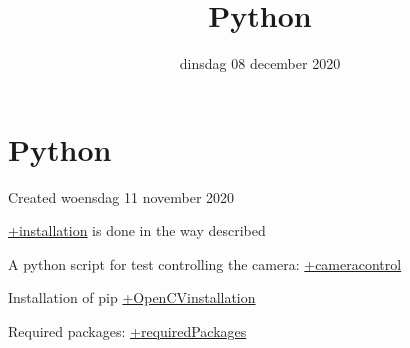 \documentclass{scrartcl}
\title{Python}
\date{dinsdag 08 december 2020}
\author{}
\begin{document}
\maketitle

		\section{Python}

Created woensdag 11 november 2020



\href{./Python/installation.tex}{+installation} is done in the way described



A python script for test controlling the camera: \href{./Python/cameracontrol.tex}{+cameracontrol} 



Installation of pip \href{./Python/OpenCVinstallation.tex}{+OpenCVinstallation}



Required packages: \href{./Python/requiredPackages.tex}{+requiredPackages}
\end{document}
